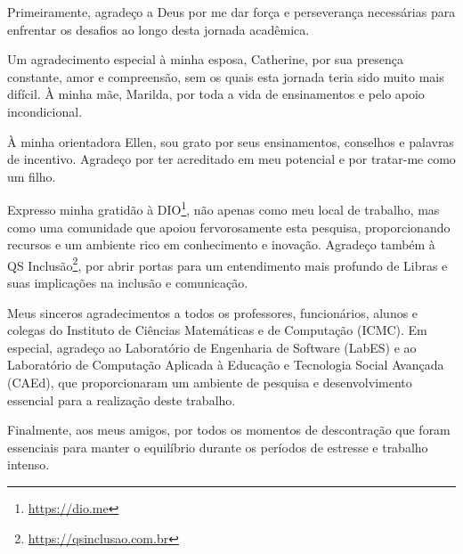 Primeiramente, agradeço a Deus por me dar força e perseverança necessárias para enfrentar os desafios ao longo desta jornada acadêmica.

Um agradecimento especial à minha esposa, Catherine, por sua presença constante, amor e compreensão, sem os quais esta jornada teria sido muito mais difícil. À minha mãe, Marilda, por toda a vida de ensinamentos e pelo apoio incondicional.

À minha orientadora Ellen, sou grato por seus ensinamentos, conselhos e palavras de incentivo. Agradeço por ter acreditado em meu potencial e por tratar-me como um filho.

Expresso minha gratidão à DIO\footnote{\url{https://dio.me}}, não apenas como meu local de trabalho, mas como uma comunidade que apoiou fervorosamente esta pesquisa, proporcionando recursos e um ambiente rico em conhecimento e inovação. Agradeço também à QS Inclusão\footnote{\url{https://qsinclusao.com.br}}, por abrir portas para um entendimento mais profundo de Libras e suas implicações na inclusão e comunicação.

Meus sinceros agradecimentos a todos os professores, funcionários, alunos e colegas do Instituto de Ciências Matemáticas e de Computação (ICMC). Em especial, agradeço ao Laboratório de Engenharia de Software (LabES) e ao Laboratório de Computação Aplicada à Educação e Tecnologia Social Avançada (CAEd), que proporcionaram um ambiente de pesquisa e desenvolvimento essencial para a realização deste trabalho.

Finalmente, aos meus amigos, por todos os momentos de descontração que foram essenciais para manter o equilíbrio durante os períodos de estresse e trabalho intenso.
